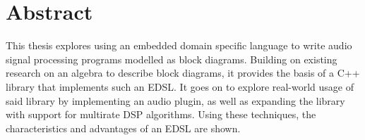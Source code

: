 \section*{Abstract}

This thesis explores using an embedded domain specific language to write audio signal processing programs
modelled as block diagrams. Building on existing research on an algebra to describe block diagrams, it
provides the basis of a C++ library that implements such an EDSL. It goes on to explore real-world usage of
said library by implementing an audio plugin, as well as expanding the library with support for multirate DSP
algorithms. Using these techniques, the characteristics and advantages of an EDSL are shown.
